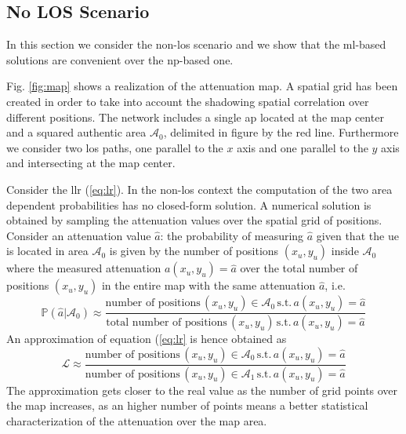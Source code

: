 \documentclass[draftcls,onecolumn,12pt]{IEEEtran}
\begin{document}
\subsection{No LOS Scenario}\label{sec:res_nLos}
In this section we consider the non-\ac{los} scenario and we show that the \ac{ml}-based solutions are convenient over the \ac{np}-based one.

Fig. \ref{fig:map} shows a realization of the attenuation map. A spatial grid has been created in order to take into account the shadowing spatial correlation over different positions. The network includes a single \ac{ap} located at the map center and a squared authentic area $\mathcal{A}_0$, delimited in figure by the red line. Furthermore we consider two \ac{los} paths, one parallel to the $x$ axis and one parallel to the $y$ axis and intersecting at the map center.

Consider the \ac{llr} (\ref{eq:lr}). In the non-\ac{los} context the computation of the two area dependent probabilities has no closed-form solution. A numerical solution is obtained by sampling the attenuation values over the spatial grid of positions. Consider an attenuation value $\hat{a}$: the probability of measuring $\hat{a}$ given that the \ac{ue} is located in area $\mathcal{A}_0$ is given by the number of positions $(x_u,y_u)$ inside $\mathcal{A}_0$ where the measured attenuation $a(x_u,y_u)=\hat{a}$ over the total number of positions $(x_u,y_u)$ in the entire map with the same attenuation $\hat{a}$, i.e.
\begin{equation}
    \mathbb{P}(\hat{a}|\mathcal{A}_0) \approx \frac{\text{number of positions} \, (x_u,y_u) \in \mathcal{A}_0 \, \text{s.t.} \, a(x_u,y_u) = \hat{a}}{\text{total number of positions} \, (x_u,y_u) \, \text{s.t.} \, a(x_u,y_u) = \hat{a}}
\end{equation}
An approximation of equation (\ref{eq:lr} is hence obtained as
\begin{equation}\label{eq:lrApp}
    \mathcal{L} \approx \frac{\text{number of positions} \, (x_u,y_u) \in \mathcal{A}_0 \, \text{s.t.} \, a(x_u,y_u) = \hat{a}}{\text{number of positions} \, (x_u,y_u) \in \mathcal{A}_1 \, \text{s.t.} \, a(x_u,y_u) = \hat{a}}
\end{equation}
The approximation gets closer to the real value as the number of grid points over the map increases, as an higher number of points means a better statistical characterization of the attenuation over the map area.
\end{document}
